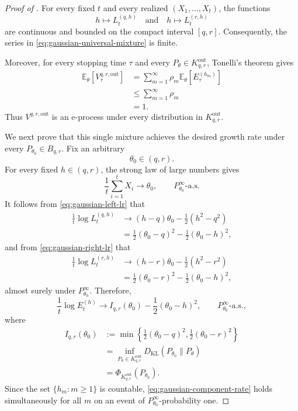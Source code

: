\documentclass[10pt,a4paper]{amsart}
\begin{document}
\begin{proof}[Proof of ]
For every fixed $t$ and every realized
$(X_1,\ldots,X_t)$, the functions
\[
    h\longmapsto L_t^{(q,h)}
    \quad\text{and}\quad
    h\longmapsto L_t^{(r,h)}
\]
are continuous and bounded on the compact interval $[q,r]$.
Consequently, the series in
\eqref{eq:gaussian-universal-mixture} is finite.

Moreover, for every stopping time $\tau$ and every
$P_\theta\in K_{q,r}^{\mathrm{out}}$, Tonelli's theorem gives
\begin{align*}
    \mathbb E_\theta
    \left[
        V_\tau^{q,r,\mathrm{out}}
    \right]
    &=
    \sum_{m=1}^\infty
    \rho_m
    \mathbb E_\theta
    \left[
        E_\tau^{(h_m)}
    \right]\\
    &\le
    \sum_{m=1}^\infty\rho_m\\
    &=1.
\end{align*}
Thus $V^{q,r,\mathrm{out}}$ is an e-process under every
distribution in $K_{q,r}^{\mathrm{out}}$.

We next prove that this single mixture achieves the desired
growth rate under every $P_{\theta_0}\in B_{q,r}$. Fix an
arbitrary
\[
    \theta_0\in(q,r).
\]
For every fixed $h\in(q,r)$, the strong law of large numbers
gives
\[
    \frac1t\sum_{i=1}^tX_i
    \longrightarrow
    \theta_0,
    \qquad
    P_{\theta_0}^\infty\text{-a.s.}
\]
It follows from \eqref{eq:gaussian-left-lr} that
\begin{align*}
    \frac1t\log L_t^{(q,h)}
    &\longrightarrow
    (h-q)\theta_0-\frac12(h^2-q^2)\\
    &=
    \frac12(\theta_0-q)^2
    -
    \frac12(\theta_0-h)^2,
\end{align*}
and from \eqref{eq:gaussian-right-lr} that
\begin{align*}
    \frac1t\log L_t^{(r,h)}
    &\longrightarrow
    (h-r)\theta_0-\frac12(h^2-r^2)\\
    &=
    \frac12(\theta_0-r)^2
    -
    \frac12(\theta_0-h)^2,
\end{align*}
almost surely under $P_{\theta_0}^\infty$. Therefore,
\begin{equation}
\label{eq:gaussian-component-rate}
    \frac1t\log E_t^{(h)}
    \longrightarrow
    I_{q,r}(\theta_0)
    -
    \frac12(\theta_0-h)^2,
    \qquad
    P_{\theta_0}^\infty\text{-a.s.},
\end{equation}
where
\begin{align}
    I_{q,r}(\theta_0)
    &:=
    \min\left\{
        \frac12(\theta_0-q)^2,
        \frac12(\theta_0-r)^2
    \right\}
    \nonumber\\
    &=
    \inf_{P_\theta\in K_{q,r}^{\mathrm{out}}}
    D_{\mathrm{KL}}(P_{\theta_0}\|P_\theta)
    \nonumber\\
    &=
    \Phi_{K_{q,r}^{\mathrm{out}}}(P_{\theta_0}).
    \label{eq:gaussian-exterior-kl}
\end{align}
Since the set $\{h_m:m\ge1\}$ is countable,
\eqref{eq:gaussian-component-rate} holds simultaneously for all
$m$ on an event of $P_{\theta_0}^\infty$-probability one.


\end{proof}
\end{document}
